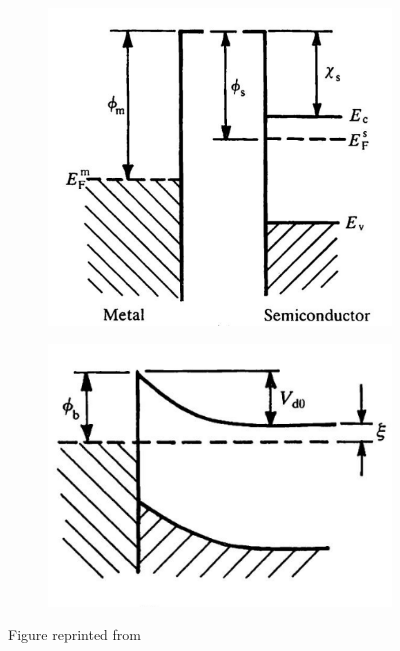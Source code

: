 \begin{figure}[h]
\centering
\begin{subfigure}{.5\textwidth}
  \centering
  \includegraphics[width=\linewidth]{fig/intro-background/metal-semi_1.png}
  \label{shottky_a}
\end{subfigure}%
\begin{subfigure}{.5\textwidth}
  \centering
  \includegraphics[width=\linewidth]{fig/intro-background/metal-semi_2.png}
  \label{shottky_b}
\end{subfigure}%
\label{schottky}
\caption{Figure reprinted from \cite{RhoderickMetal-SemiconductorEDITION}}
\end{figure}


